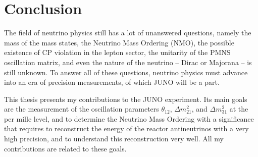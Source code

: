 \documentclass[../main.tex]{subfiles}
\begin{document}
\chapter*{Conclusion}

The field of neutrino physics still has a lot of unanswered questions, namely the mass of the mass states, the Neutrino Mass Ordering (NMO), the possible existence of CP violation in the lepton sector, the unitarity of the PMNS oscillation matrix, and even the nature of the neutrino -- Dirac or Majorana -- is still unknown. To answer all of these questions, neutrino physics must advance into an era of precision measurements, of which JUNO will be a part.
%
%
%

This thesis presents my contributions to the JUNO experiment. Its main goals are the measurement of the oscillation parameters $\theta_{12}$, $\Delta m^2_{21}$, and $\Delta m^2_{31}$ at the per mille level, and to determine the Neutrino Mass Ordering with a significance that requires to reconstruct the energy of the reactor antineutrinos with a very high precision, and to understand this reconstruction very well. All my contributions are related to these goals.
\end{document}
